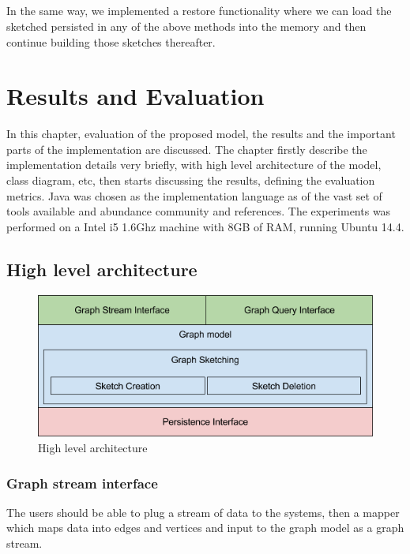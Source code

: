 \documentclass[12pt]{report}
\numberwithin{figure}{section}
\numberwithin{table}{section}
\begin{document}
\paragraph{}

In the same way, we implemented a restore functionality where we can load the sketched persisted in any of the above methods into the memory and then continue building those sketches thereafter.

\chapter{Results and Evaluation}
In this chapter, evaluation of the proposed model, the results and the important parts of the implementation are discussed. The chapter firstly describe the implementation details very briefly, with high level architecture of the model, class diagram, etc, then starts discussing the results, defining the evaluation metrics. Java was chosen as the implementation language as of the vast set of tools available and abundance community and references. The experiments was performed on a Intel i5 1.6Ghz machine with 8GB of RAM, running Ubuntu 14.4.

\section{High level architecture}

\begin{figure}[H]
\centering
\includegraphics[scale=0.7]{images/image01}
\caption{High level architecture}
\end{figure}

\subsection*{Graph stream interface}
The users should be able to plug a stream of data to the systems, then a mapper which maps data into edges and vertices and input to the graph model as a graph stream.
\end{document}
